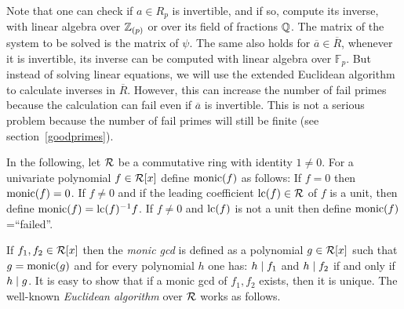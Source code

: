 \documentclass[10pt]{article}
\newcommand{\Q}{\QQ}
\newcommand{\Z}{\ZZ}
\newcommand{\Fp}{{\mathbb F}_p}
\newcommand{\x}{x}
\begin{document}
Note that one can check if $a \in R_p$ is invertible, and if so, compute
its inverse, with linear algebra over $\Z_{(p)}$ or over its field of
fractions $\Q$. The matrix of the system to be solved is the matrix of $\psi$.
The same also holds for $\overline{a} \in \overline{R}$, whenever it is
invertible, its inverse can be computed with linear algebra over $\Fp$.
But instead of solving linear equations, we will use the extended Euclidean algorithm to calculate inverses in $\overline{R}$.
However, this can increase the number of fail primes because
the calculation can fail even if $\overline{a}$ is invertible.
This is not a serious problem because the number of fail
primes will still be finite (see section~\ref{goodprimes}).



In the following, let ${\cal R}$ be a commutative ring
with identity $1 \neq 0$.
For a univariate polynomial $f \in {\cal R}[\x]$
define ${\rm monic}(f)$ as follows:
If $f=0$ then ${\rm monic}(f)=0$. If $f \neq 0$ and if the
leading coefficient ${\rm lc}(f) \in {\cal R}$ of $f$ is a unit, then define
${\rm monic}(f) = {\rm lc}(f)^{-1}f$. If $f \neq 0$ and ${\rm lc}(f)$
is not a unit then define ${\rm monic}(f)$=``failed''.


If $f_1,f_2 \in {\cal R}[\x]$ then the
{\em monic gcd} is defined as a polynomial $g \in {\cal R}[\x]$ such
that $g={\rm monic}(g)$ and for every
polynomial $h$ one has:  $h\mid f_1$ and $h\mid f_2$ if and only if
$h\mid g$. It is easy to show that if a monic gcd of $f_1,f_2$ exists,
then it is unique.
The well-known {\em Euclidean algorithm} over
${\cal R}$ works as follows. \\
\end{document}
